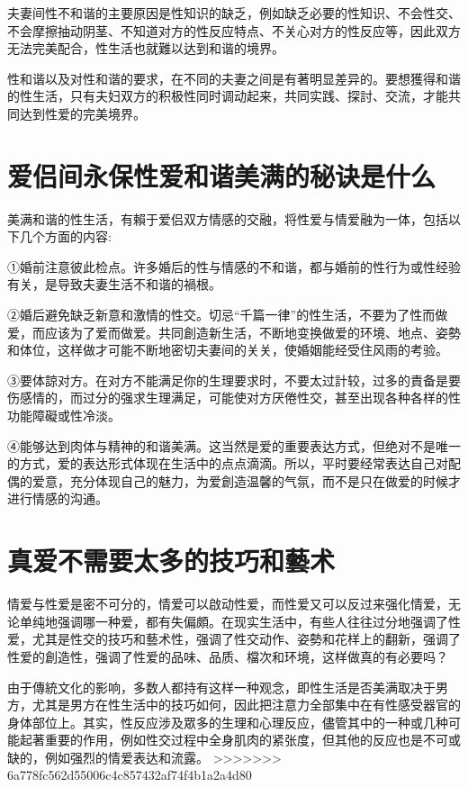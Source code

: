 \documentclass[12pt,UTF8]{ctexbook}
\begin{document}
夫妻间性不和谐的主要原因是性知识的缺乏，例如缺乏必要的性知识、不会性交、不会摩擦抽动阴茎、不知道对方的性反应特点、不关心对方的性反应等，因此双方无法完美配合，性生活也就難以达到和谐的境界。

性和谐以及对性和谐的要求，在不同的夫妻之间是有著明显差异的。要想獲得和谐的性生活，只有夫妇双方的积极性同时调动起来，共同实践、探討、交流，才能共同达到性爱的完美境界。

\section{爱侣间永保性爱和谐美满的秘诀是什么}

美满和谐的性生活，有賴于爱侣双方情感的交融，将性爱与情爱融为一体，包括以下几个方面的内容:

①婚前注意彼此检点。许多婚后的性与情感的不和谐，都与婚前的性行为或性经验有关，是导致夫妻生活不和谐的禍根。

②婚后避免缺乏新意和激情的性交。切忌“千篇一律”的性生活，不要为了性而做爱，而应该为了爱而做爱。共同創造新生活，不断地变换做爱的环境、地点、姿勢和体位，这样做才可能不断地密切夫妻间的关关，使婚姻能经受住风雨的考验。

③要体諒对方。在对方不能满足你的生理要求时，不要太过計较，过多的責备是要伤感情的，而过分的强求生理满足，可能使对方厌倦性交，甚至出现各种各样的性功能障礙或性冷淡。

④能够达到肉体与精神的和谐美满。这当然是爱的重要表达方式，但绝对不是唯一的方式，爱的表达形式体现在生活中的点点滴滴。所以，平时要经常表达自己对配偶的爱意，充分体现自己的魅力，为爱創造温馨的气氛，而不是只在做爱的时候才进行情感的沟通。

\section{真爱不需要太多的技巧和藝术}

情爱与性爱是密不可分的，情爱可以啟动性爱，而性爱又可以反过来强化情爱，无论单纯地强调哪一种爱，都有失偏頗。在现实生活中，有些人往往过分地强调了性爱，尤其是性交的技巧和藝术性，强调了性交动作、姿勢和花样上的翻新，强调了性爱的創造性，强调了性爱的品味、品质、檔次和环境，这样做真的有必要吗？

由于傳統文化的影响，多数人都持有这样一种观念，即性生活是否美满取决于男方，尤其是男方在性生活中的技巧如何，因此把注意力全部集中在有性感受器官的身体部位上。其实，性反应涉及眾多的生理和心理反应，儘管其中的一种或几种可能起著重要的作用，例如性交过程中全身肌肉的紧张度，但其他的反应也是不可或缺的，例如强烈的情爱表达和流露。
>>>>>>> 6a778fc562d55006c4c857432af74f4b1a2a4d80
\end{document}
